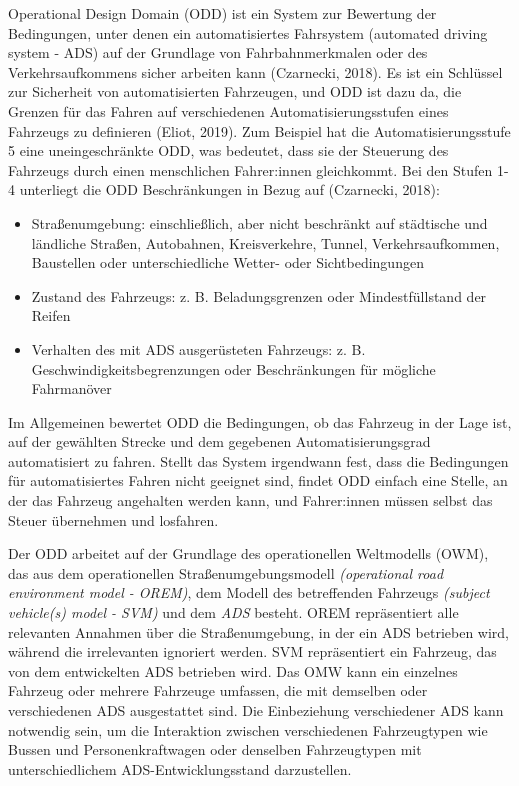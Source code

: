 \documentclass[
]{book}
\providecommand{\tightlist}{%
  \setlength{\itemsep}{0pt}\setlength{\parskip}{0pt}}
\begin{document}
Operational Design Domain (ODD) ist ein System zur Bewertung der Bedingungen, unter denen ein automatisiertes Fahrsystem (automated driving system - ADS) auf der Grundlage von Fahrbahnmerkmalen oder des Verkehrsaufkommens sicher arbeiten kann (Czarnecki, 2018). Es ist ein Schlüssel zur Sicherheit von automatisierten Fahrzeugen, und ODD ist dazu da, die Grenzen für das Fahren auf verschiedenen Automatisierungsstufen eines Fahrzeugs zu definieren (Eliot, 2019). Zum Beispiel hat die Automatisierungsstufe 5 eine uneingeschränkte ODD, was bedeutet, dass sie der Steuerung des Fahrzeugs durch einen menschlichen Fahrer:innen gleichkommt. Bei den Stufen 1-4 unterliegt die ODD Beschränkungen in Bezug auf (Czarnecki, 2018):

\begin{itemize}
\tightlist
\item
  Straßenumgebung: einschließlich, aber nicht beschränkt auf städtische und ländliche Straßen, Autobahnen, Kreisverkehre, Tunnel, Verkehrsaufkommen, Baustellen oder unterschiedliche Wetter- oder Sichtbedingungen
\item
  Zustand des Fahrzeugs: z. B. Beladungsgrenzen oder Mindestfüllstand der Reifen
\item
  Verhalten des mit ADS ausgerüsteten Fahrzeugs: z. B. Geschwindigkeitsbegrenzungen oder Beschränkungen für mögliche Fahrmanöver
\end{itemize}

Im Allgemeinen bewertet ODD die Bedingungen, ob das Fahrzeug in der Lage ist, auf der gewählten Strecke und dem gegebenen Automatisierungsgrad automatisiert zu fahren. Stellt das System irgendwann fest, dass die Bedingungen für automatisiertes Fahren nicht geeignet sind, findet ODD einfach eine Stelle, an der das Fahrzeug angehalten werden kann, und Fahrer:innen müssen selbst das Steuer übernehmen und losfahren.

Der ODD arbeitet auf der Grundlage des operationellen Weltmodells (OWM), das aus dem operationellen Straßenumgebungsmodell \emph{(operational road environment model - OREM)}, dem Modell des betreffenden Fahrzeugs \emph{(subject vehicle(s) model - SVM)} und dem \emph{ADS} besteht. OREM repräsentiert alle relevanten Annahmen über die Straßenumgebung, in der ein ADS betrieben wird, während die irrelevanten ignoriert werden. SVM repräsentiert ein Fahrzeug, das von dem entwickelten ADS betrieben wird. Das OMW kann ein einzelnes Fahrzeug oder mehrere Fahrzeuge umfassen, die mit demselben oder verschiedenen ADS ausgestattet sind. Die Einbeziehung verschiedener ADS kann notwendig sein, um die Interaktion zwischen verschiedenen Fahrzeugtypen wie Bussen und Personenkraftwagen oder denselben Fahrzeugtypen mit unterschiedlichem ADS-Entwicklungsstand darzustellen.
\end{document}
